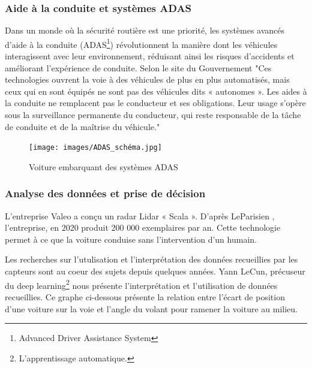 \subsubsection{Aide à la conduite et systèmes ADAS}
Dans un monde où la sécurité routière est une priorité, les systèmes avancés d’aide à la conduite (ADAS\footnote{Advanced Driver Assistance System}) révolutionnent la manière dont les véhicules interagissent avec leur environnement, réduisant ainsi les risques d’accidents et améliorant l’expérience de conduite.
Selon le site du Gouvernement \cite{adas_gouv} "Ces technologies ouvrent la voie à des véhicules de plus en plus automatisés, mais ceux qui en sont équipés ne sont pas des véhicules dits « autonomes ». Les aides à la conduite ne remplacent pas le conducteur et ses obligations. Leur usage s’opère sous la surveillance permanente du conducteur, qui reste responsable de la tâche de conduite et de la maîtrise du véhicule."
\begin{figure}[h]
    \centering
    \texttt{[image: images/ADAS\_schéma.jpg]} 
    \caption{Voiture embarquant des systèmes ADAS\cite{continental_adas}}
\end{figure}




\subsubsection{Analyse des données et prise de décision}
L'entreprise Valeo a conçu un radar Lidar « Scala ». D'après LeParisien \cite{le_parisien_radar_2019}, l'entreprise, en 2020 produit 200 000 exemplaires par an. Cette technologie permet à ce que la voiture conduise sans l'intervention d'un humain.


Les recherches sur l'utulisation et l'interprétation des données recueillies par les capteurs sont au coeur des sujets depuis quelques années. Yann LeCun, précuseur du deep learning\footnote{L'apprentissage automatique.} nous présente l'interprétation et l'utilisation de données recueillies.
Ce graphe ci-dessous présente la relation entre l’écart de position d’une voiture sur la voie et l’angle du volant pour ramener la voiture au milieu. 

